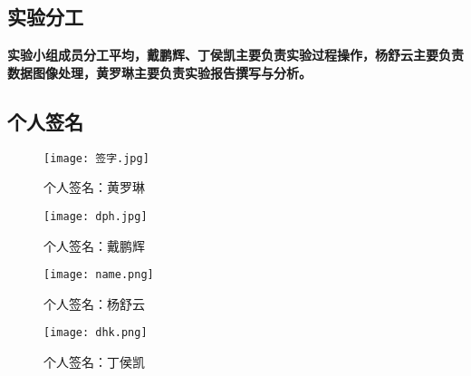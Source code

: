 

\clearpage
{}
\subsection{实验分工}
\textbf{实验小组成员分工平均，戴鹏辉、丁侯凯主要负责实验过程操作，杨舒云主要负责数据图像处理，黄罗琳主要负责实验报告撰写与分析。}
\subsection{个人签名}



\begin{figure}[H]
    \centering
    \begin{minipage}{0.45\textwidth} %
        \centering
        \texttt{[image: 签字.jpg]}
        \caption{个人签名：黄罗琳}
        \label{}
    \end{minipage}%
    \hfill
    \begin{minipage}{0.45\textwidth} %
        \centering
        \texttt{[image: dph.jpg]}
        \caption{个人签名：戴鹏辉}
        \label{}
    \end{minipage}
\end{figure}

\begin{figure}[H]
    \centering
    \begin{minipage}{0.45\textwidth} %
        \centering
        \texttt{[image: name.png]}
        \caption{个人签名：杨舒云}
        \label{fig:name}
    \end{minipage}
    \hfill %
    \begin{minipage}{0.45\textwidth} %
        \centering
        \texttt{[image: dhk.png]}
        \caption{个人签名：丁侯凯}
        \label{fig:dhk}
    \end{minipage}
\end{figure}


\begin{enumerate}[label=\textbf{[\arabic*]},ref=\arabic*]

\end{enumerate}


